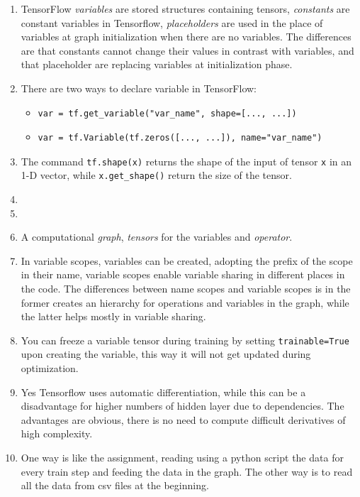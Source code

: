 \documentclass{article}
\begin{document}
\begin{enumerate}
\item TensorFlow \emph{variables} are stored structures containing tensors, \emph{constants} are constant variables in Tensorflow, \emph{placeholders} are used in the place of variables at graph initialization when there are no variables. The differences are that constants cannot change their values in contrast with variables, and that placeholder are replacing variables at initialization phase.
\item There are two ways to declare variable in TensorFlow:
\begin{itemize}
\item \begin{small}
\begin{verbatim}
var = tf.get_variable("var_name", shape=[..., ...])
\end{verbatim}
\end{small}
\item \begin{small}
\begin{verbatim}
var = tf.Variable(tf.zeros([..., ...]), name="var_name")
\end{verbatim}
\end{small}
\end{itemize}

\item The command \texttt{tf.shape(x)} returns the shape of the input of tensor \texttt{x} in an 1-D vector, while \texttt{x.get\_shape()} return the size of the tensor.
\item
\item
\item A computational \emph{graph}, \emph{tensors} for the variables and \emph{operator}.
\item In variable scopes, variables can be created, adopting the prefix of the scope in their name, variable scopes enable variable sharing in different places in the code. The differences between name scopes and variable scopes is in the former creates an hierarchy for operations and variables in the graph, while the latter helps mostly in variable sharing.
\item You can freeze a variable tensor during training by setting \texttt{trainable=True} upon creating the variable, this way it will not get updated during optimization.
\item Yes Tensorflow uses automatic differentiation, while this can be a disadvantage for higher numbers of hidden layer due to dependencies.
The advantages are obvious, there is no need to compute difficult derivatives of high complexity.
\item One way is like the assignment, reading using a python script the data for every train step and feeding the data in the graph.
The other way is to read all the data from csv files at the beginning.
\end{enumerate}
\end{document}
